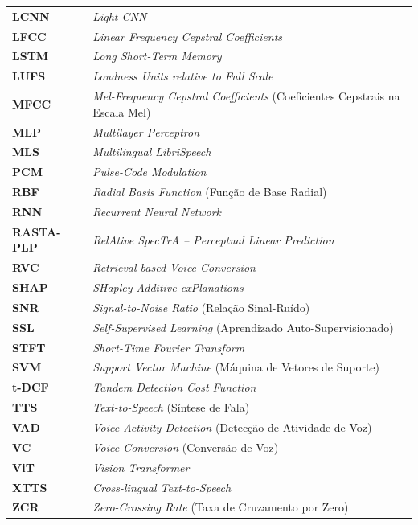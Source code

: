 \documentclass[12pt,a4paper]{article}
\begin{document}
\begin{singlespace}
\begin{tabular}{p{2.5cm}p{12cm}}
\textbf{LCNN}    & \textit{Light CNN} \\
\textbf{LFCC}    & \textit{Linear Frequency Cepstral Coefficients} \\
\textbf{LSTM}    & \textit{Long Short-Term Memory} \\
\textbf{LUFS}    & \textit{Loudness Units relative to Full Scale} \\
\textbf{MFCC}    & \textit{Mel-Frequency Cepstral Coefficients} (Coeficientes Cepstrais na Escala Mel) \\
\textbf{MLP}     & \textit{Multilayer Perceptron} \\
\textbf{MLS}     & \textit{Multilingual LibriSpeech} \\
\textbf{PCM}     & \textit{Pulse-Code Modulation} \\
\textbf{RBF}     & \textit{Radial Basis Function} (Função de Base Radial) \\
\textbf{RNN}     & \textit{Recurrent Neural Network} \\
\textbf{RASTA-PLP} & \textit{RelAtive SpecTrA -- Perceptual Linear Prediction} \\
\textbf{RVC}     & \textit{Retrieval-based Voice Conversion} \\
\textbf{SHAP}    & \textit{SHapley Additive exPlanations} \\
\textbf{SNR}     & \textit{Signal-to-Noise Ratio} (Relação Sinal-Ruído) \\
\textbf{SSL}     & \textit{Self-Supervised Learning} (Aprendizado Auto-Supervisionado) \\
\textbf{STFT}    & \textit{Short-Time Fourier Transform} \\
\textbf{SVM}     & \textit{Support Vector Machine} (Máquina de Vetores de Suporte) \\
\textbf{t-DCF}   & \textit{Tandem Detection Cost Function} \\
\textbf{TTS}     & \textit{Text-to-Speech} (Síntese de Fala) \\
\textbf{VAD}     & \textit{Voice Activity Detection} (Detecção de Atividade de Voz) \\
\textbf{VC}      & \textit{Voice Conversion} (Conversão de Voz) \\
\textbf{ViT}     & \textit{Vision Transformer} \\
\textbf{XTTS}    & \textit{Cross-lingual Text-to-Speech} \\
\textbf{ZCR}     & \textit{Zero-Crossing Rate} (Taxa de Cruzamento por Zero) \\
\end{tabular}
\end{singlespace}
\end{document}

